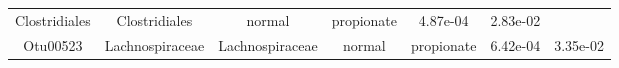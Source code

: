 \documentclass[11pt,]{article}
\begin{document}
\begin{longtable}[]{@{}ccccccc@{}}
\begin{minipage}[t]{0.17\columnwidth}
Clostridiales\strut
\end{minipage} & \begin{minipage}[t]{0.17\columnwidth}\centering\strut
Clostridiales\strut
\end{minipage} & \begin{minipage}[t]{0.09\columnwidth}\centering\strut
normal\strut
\end{minipage} & \begin{minipage}[t]{0.11\columnwidth}\centering\strut
propionate\strut
\end{minipage} & \begin{minipage}[t]{0.09\columnwidth}\centering\strut
4.87e-04\strut
\end{minipage} & \begin{minipage}[t]{0.09\columnwidth}\centering\strut
2.83e-02\strut
\end{minipage}\tabularnewline
\begin{minipage}[t]{0.09\columnwidth}\centering\strut
Otu00523\strut
\end{minipage} & \begin{minipage}[t]{0.17\columnwidth}\centering\strut
Lachnospiraceae\strut
\end{minipage} & \begin{minipage}[t]{0.17\columnwidth}\centering\strut
Lachnospiraceae\strut
\end{minipage} & \begin{minipage}[t]{0.09\columnwidth}\centering\strut
normal\strut
\end{minipage} & \begin{minipage}[t]{0.11\columnwidth}\centering\strut
propionate\strut
\end{minipage} & \begin{minipage}[t]{0.09\columnwidth}\centering\strut
6.42e-04\strut
\end{minipage} & \begin{minipage}[t]{0.09\columnwidth}\centering\strut
3.35e-02\strut
\end{minipage}\tabularnewline
\bottomrule
\end{longtable}

\normalsize
\end{document}
